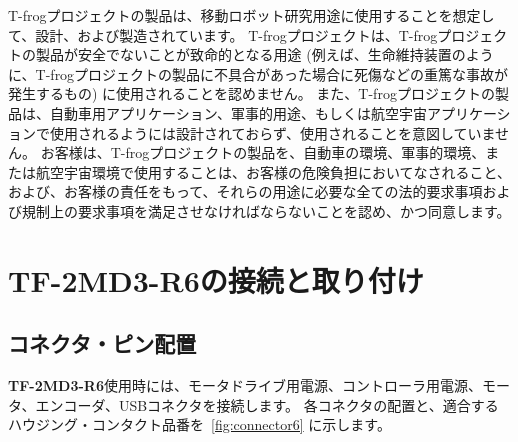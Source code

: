 \documentclass[11pt,a4j,openany]{jbook}
\begin{document}
T-frogプロジェクトの製品は、移動ロボット研究用途に使用することを想定して、設計、および製造されています。
T-frogプロジェクトは、T-frogプロジェクトの製品が安全でないことが致命的となる用途 (例えば、生命維持装置のように、T-frogプロジェクトの製品に不具合があった場合に死傷などの重篤な事故が発生するもの) に使用されることを認めません。
また、T-frogプロジェクトの製品は、自動車用アプリケーション、軍事的用途、もしくは航空宇宙アプリケーションで使用されるようには設計されておらず、使用されることを意図していません。
お客様は、T-frogプロジェクトの製品を、自動車の環境、軍事的環境、または航空宇宙環境で使用することは、お客様の危険負担においてなされること、および、お客様の責任をもって、それらの用途に必要な全ての法的要求事項および規制上の要求事項を満足させなければならないことを認め、かつ同意します。
\par



\newpage
\section{{\bf TF-2MD3-R6}の接続と取り付け}
\label{sec:モータドライバの接続}

\subsection{コネクタ・ピン配置}
\label{sec:コネクタ}

{\bf TF-2MD3-R6}使用時には、モータドライブ用電源、コントローラ用電源、モータ、エンコーダ、USBコネクタを接続します。
各コネクタの配置と、適合するハウジング・コンタクト品番を\figurename~\ref{fig:connector6} に示します。
\par
\end{document}
